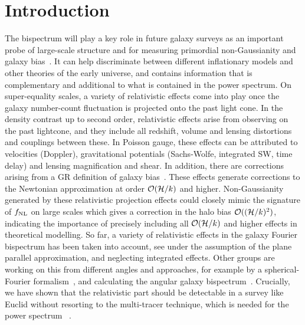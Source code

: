\section{Introduction}
The bispectrum will play a key role in future galaxy surveys as an  important probe of large-scale structure and for measuring primordial 
non-Gaussianity and galaxy bias~\cite{Jeong:2009vd,Baldauf:2010vn,Celoria:2018euj}. It can help discriminate between different inflationary models and other theories of the early universe, and contains information that is complementary and additional to what is contained in the power spectrum. 
On super-equality scales, a variety of relativistic effects come into play once the galaxy number-count fluctuation is projected onto the past light cone. In the density contrast up to second order, relativistic effects arise from observing on the past lightcone, and they include all redshift, volume and lensing distortions and couplings between these. In Poisson gauge, these effects can be attributed to velocities (Doppler), gravitational potentials (Sachs-Wolfe, integrated SW, time delay) and lensing magnification and shear. In addition, there are corrections arising from a GR definition of galaxy bias~\cite{Bertacca:2014wga}. These effects generate corrections to the Newtonian approximation at order $\mathcal{O}(\mathcal{H}/k)$ and higher. Non-Gaussianity generated by these relativistic projection effects could closely mimic the signature of \(f_\text{NL}\) on large scales which gives a correction in the halo bias $\mathcal{O}((\mathcal{H}/k)^2)$, indicating the importance of precisely including all $\mathcal{O}(\mathcal{H}/k)$ and higher effects in theoretical modelling. So far, a variety of relativistic effects in the galaxy Fourier bispectrum has been taken into account, see 
\cite{Umeh:2016nuh,Jolicoeur:2017nyt,Jolicoeur:2017eyi,Jolicoeur:2018blf,Clarkson:2018dwn,Maartens:2019yhx} under the assumption of the plane parallel approximation, and neglecting integrated effects. Other groups are working on this from different angles and approaches, for example by a spherical-Fourier formalism~\cite{Bertacca:2017dzm}, and calculating the angular galaxy bispectrum~\cite{DiDio:2016gpd,DiDio:2018unb}. Crucially, we have shown that the relativistic part should be detectable in a survey like Euclid without resorting to the multi-tracer technique, which is needed for the power spectrum~\cite{Maartens:2019yhx} . 

